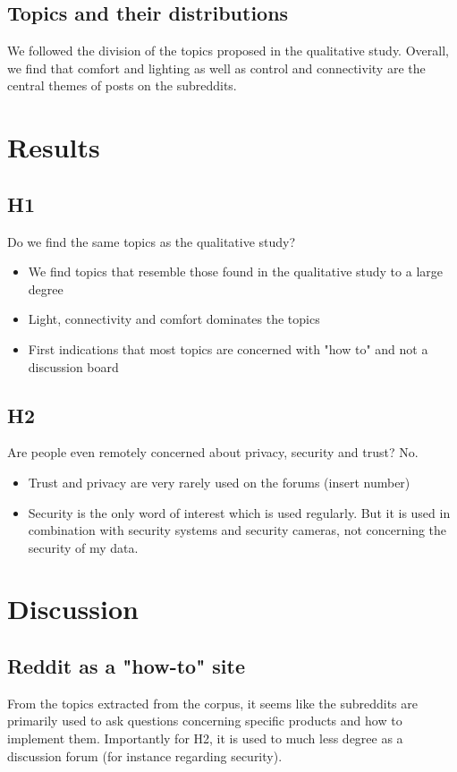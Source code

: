 \documentclass{article}
\begin{document}
    \subsection{Topics and their distributions}
    We followed the division of the topics proposed in the qualitative study. Overall, we find that comfort and lighting as well as control and connectivity are the central themes of posts on the subreddits. 
    \section{Results}
    \subsection{H1}
    Do we find the same topics as the qualitative study?
    \begin{itemize}
        \item We find topics that resemble those found in the qualitative study to a large degree
        \item Light, connectivity and comfort dominates the topics
        \item First indications that most topics are concerned with "how to" and not a discussion board
    \end{itemize}
    \subsection{H2}
    Are people even remotely concerned about privacy, security and trust?
    No.
    \begin{itemize}
        \item Trust and privacy are very rarely used on the forums (insert number)
        \item Security is the only word of interest which is used regularly. But it is used in combination with security systems and security cameras, not concerning the security of my data.
    \end{itemize}
    \section{Discussion}
    \subsection{Reddit as a "how-to" site}
        From the topics extracted from the corpus, it seems like the subreddits are primarily used to ask questions concerning specific products and how to implement them. Importantly for H2, it is used to much less degree as a discussion forum (for instance regarding security).
\end{document}
